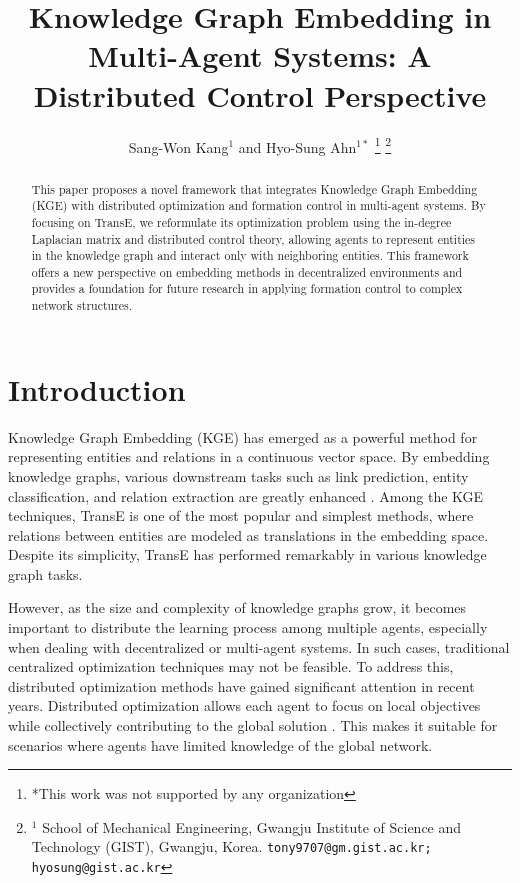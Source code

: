 \documentclass[letterpaper, 10 pt, conference]{ieeeconf}  %
\title{\LARGE \bf
Knowledge Graph Embedding in Multi-Agent Systems: A Distributed Control Perspective
}
\author{Sang-Won Kang${}^{1}$ and Hyo-Sung Ahn${}^{1*}$%
\thanks{*This work was not supported by any organization}%
\thanks{$^{1}$ School of Mechanical Engineering, Gwangju Institute of Science and Technology (GIST), Gwangju, Korea. 
        {\tt\small tony9707@gm.gist.ac.kr; hyosung@gist.ac.kr}}%
}
\begin{document}
\maketitle

\thispagestyle{empty}
\pagestyle{empty}

\begin{abstract}
This paper proposes a novel framework that integrates Knowledge Graph Embedding (KGE) with distributed optimization and formation control in multi-agent systems. By focusing on TransE, we reformulate its optimization problem using the in-degree Laplacian matrix and distributed control theory, allowing agents to represent entities in the knowledge graph and interact only with neighboring entities. This framework offers a new perspective on embedding methods in decentralized environments and provides a foundation for future research in applying formation control to complex network structures. 
\end{abstract}


\section{Introduction}
Knowledge Graph Embedding (KGE) has emerged as a powerful method for representing entities and relations in a continuous vector space. By embedding knowledge graphs, various downstream tasks such as link prediction, entity classification, and relation extraction are greatly enhanced \cite{wang_knowledge_2017}. Among the KGE techniques, TransE \cite{bordes_translating_2013} is one of the most popular and simplest methods, where relations between entities are modeled as translations in the embedding space. Despite its simplicity, TransE has performed remarkably in various knowledge graph tasks.

However, as the size and complexity of knowledge graphs grow, it becomes important to distribute the learning process among multiple agents, especially when dealing with decentralized or multi-agent systems. In such cases, traditional centralized optimization techniques may not be feasible. To address this, distributed optimization methods have gained significant attention in recent years. Distributed optimization allows each agent to focus on local objectives while collectively contributing to the global solution \cite{yang_survey_2019}. This makes it suitable for scenarios where agents have limited knowledge of the global network.
\end{document}
